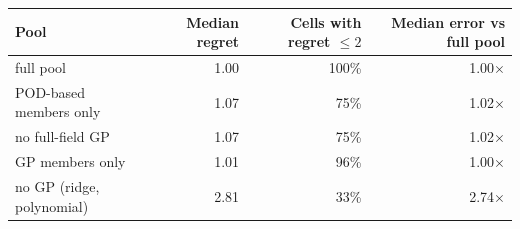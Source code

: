 \begin{tabular}{lrrr}
\toprule
Pool & Median regret & Cells with regret $\le2$ & Median error vs full pool \\
\midrule
full pool & 1.00 & 100\% & 1.00$\times$ \\
POD-based members only & 1.07 & 75\% & 1.02$\times$ \\
no full-field GP & 1.07 & 75\% & 1.02$\times$ \\
GP members only & 1.01 & 96\% & 1.00$\times$ \\
no GP (ridge, polynomial) & 2.81 & 33\% & 2.74$\times$ \\
\bottomrule
\end{tabular}
